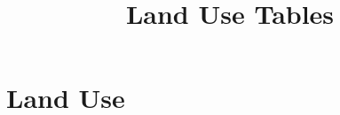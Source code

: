 \documentclass{article}
\title{Land Use Tables}
\begin{document}
\maketitle
\tableofcontents
{\footnotesize 
\listoffigures
\listoftables}
\clearpage

\section{Land Use}


\clearpage

\clearpage


\clearpage

\clearpage
\end{document}
